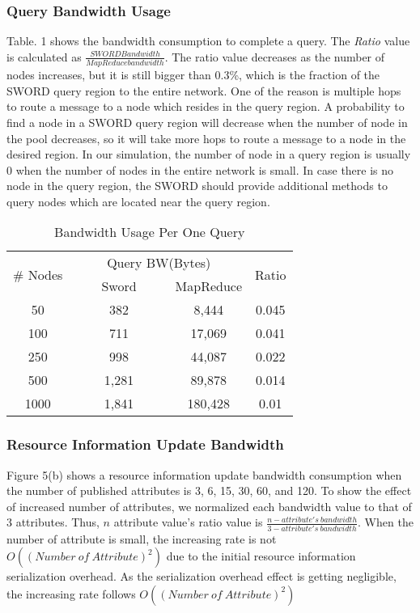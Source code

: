 \documentclass{acm_proc_article-sp}
\begin{document}
\subsubsection{Query Bandwidth Usage}
Table. 1 shows the bandwidth consumption to complete a query. The \textit{Ratio} value is calculated as \begin{math}\frac{SWORD Bandwidth}{MapReduce bandwidth}\end{math}. The ratio value decreases as the number of nodes
increases, but it is still bigger than 0.3\%, which is the fraction of the SWORD query region to the entire network. One of the reason is multiple hops to route a message to a node which resides in the query region.
A probability to find a node in a SWORD query region will decrease when the number of node in the pool decreases, so it will take more hops to route a message to a node in the desired region. 
In our simulation, the number of node in a query region is usually 0 when the number of nodes in the entire network is small. 
In case there is no node in the query region, the SWORD should provide additional methods to query nodes which are located near the query region.
\begin{table}
\centering
\caption{Bandwidth Usage Per One Query}
\begin{center}
\begin{tabular}{|c|c|c|c|} \hline
\multirow{2}{*}{\# Nodes}&\multicolumn{2}{|c|}{Query BW(Bytes)}&\multirow{2}{*}{Ratio} \\ \cline{2-3}
\ &\ \ \ \ Sword\ \ \ \ &MapReduce& \\ \hline\hline
50&382&8,444&0.045\\ \hline
100&711&17,069&0.041\\ \hline
250&998&44,087&0.022\\ \hline
500&1,281&89,878&0.014\\ \hline
1000&1,841&180,428&0.01\\ \hline
\end{tabular}
\end{center}
\end{table}
\subsubsection{Resource Information Update Bandwidth}
Figure 5(b) shows a resource information update bandwidth consumption when the number of published attributes is 3, 6, 15, 30, 60, and 120. 
To show the effect of increased number of attributes, we normalized each bandwidth value to that of 3 attributes.
Thus, $n$ attribute value's ratio value is \begin{math}\frac{n-attribute's\ bandwidth}{3-attribute's\ bandwidth}\end{math}. 
When the number of attribute is small, the increasing rate is not $O((Number\ of\ Attribute)^2)$ due to the initial resource information serialization overhead.
As the serialization overhead effect is getting negligible, the increasing rate follows $O((Number\ of\ Attribute)^2)$
\end{document}
